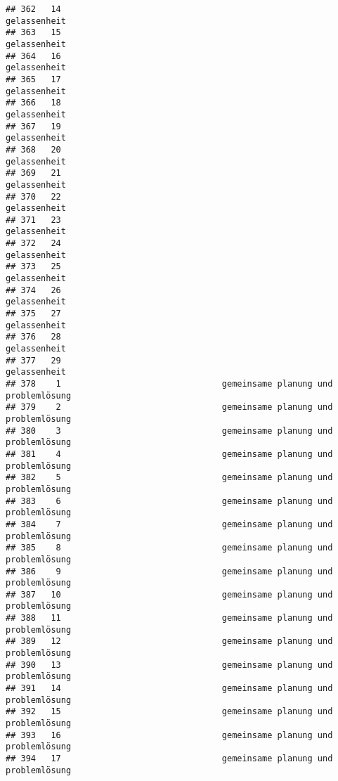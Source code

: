 \documentclass[
]{article}
\begin{document}
\begin{verbatim}
## 362   14                                                        gelassenheit
## 363   15                                                        gelassenheit
## 364   16                                                        gelassenheit
## 365   17                                                        gelassenheit
## 366   18                                                        gelassenheit
## 367   19                                                        gelassenheit
## 368   20                                                        gelassenheit
## 369   21                                                        gelassenheit
## 370   22                                                        gelassenheit
## 371   23                                                        gelassenheit
## 372   24                                                        gelassenheit
## 373   25                                                        gelassenheit
## 374   26                                                        gelassenheit
## 375   27                                                        gelassenheit
## 376   28                                                        gelassenheit
## 377   29                                                        gelassenheit
## 378    1                                gemeinsame planung und problemlösung
## 379    2                                gemeinsame planung und problemlösung
## 380    3                                gemeinsame planung und problemlösung
## 381    4                                gemeinsame planung und problemlösung
## 382    5                                gemeinsame planung und problemlösung
## 383    6                                gemeinsame planung und problemlösung
## 384    7                                gemeinsame planung und problemlösung
## 385    8                                gemeinsame planung und problemlösung
## 386    9                                gemeinsame planung und problemlösung
## 387   10                                gemeinsame planung und problemlösung
## 388   11                                gemeinsame planung und problemlösung
## 389   12                                gemeinsame planung und problemlösung
## 390   13                                gemeinsame planung und problemlösung
## 391   14                                gemeinsame planung und problemlösung
## 392   15                                gemeinsame planung und problemlösung
## 393   16                                gemeinsame planung und problemlösung
## 394   17                                gemeinsame planung und problemlösung

\end{verbatim}
\end{document}
